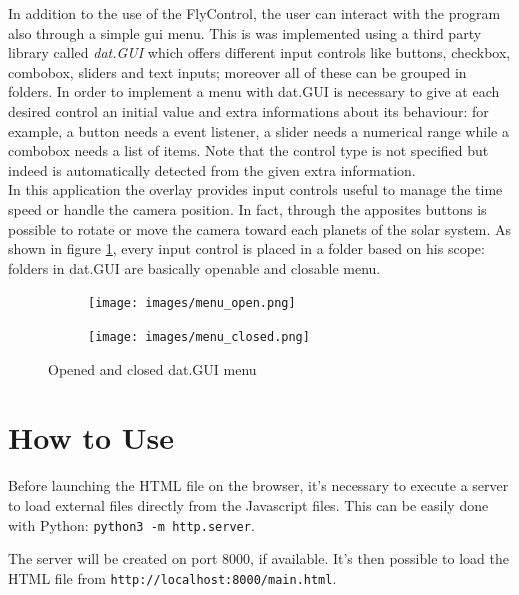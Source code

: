 \documentclass[paper=a4, fontsize=11pt]{scrartcl} %
\numberwithin{equation}{section} %
\numberwithin{figure}{section} %
\numberwithin{table}{section} %
\theoremstyle{definition}
\begin{document}
In addition to the use of the FlyControl, the user can interact with the program also through a simple gui menu. This is was implemented using a third party library called \textit{dat.GUI} \cite{datgui} which offers different input controls like buttons, checkbox, combobox, sliders and text inputs; moreover all of these can be grouped in folders. In order to implement a menu with dat.GUI is necessary to give at each desired control an initial value and extra informations about its behaviour: for example, a button needs a event listener, a slider needs a numerical range while a combobox needs a list of items. Note that the control type is not specified but indeed is automatically detected from the given extra information.\\
In this application the overlay provides input controls useful to manage the time speed or handle the camera position. In fact, through the apposites buttons is possible to rotate or move the camera toward each planets of the solar system.
As shown in figure \ref{fig:menu}, every input control is placed in a folder based on his scope: folders in dat.GUI are basically openable and closable menu.\\

\begin{figure}
	\centering
	\begin{subfigure}{.4\textwidth}
		\centering
		\texttt{[image: images/menu\_open.png]}
	\end{subfigure}
	\begin{subfigure}{.4\textwidth}
		\centering
		\texttt{[image: images/menu\_closed.png]}
	\end{subfigure}
	\caption{Opened and closed dat.GUI menu}
	\label{fig:menu}
\end{figure}


\section{How to Use}

Before launching the HTML file on the browser, it's necessary to execute a
server to load external files directly from the Javascript files. This can be
easily done with Python: \texttt{python3 -m http.server}.

The server will be created on port 8000, if available. It's then possible
to load the HTML file from \texttt{http://localhost:8000/main.html}.
\end{document}
